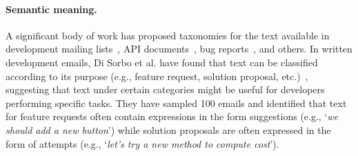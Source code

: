 









\paragraph{\textbf{Semantic meaning.}}


A significant body of work has 
 proposed taxonomies for the text available 
 in development mailing lists~\cite{Sorbo2015, huang2018automating},
API documents~\cite{Maalej2013}, bug reports~\cite{Arya2019}, and others.
In written development emails, Di Sorbo et al. have found that 
text can be classified according to its purpose (e.g., feature request, solution proposal, etc.)~\cite{Sorbo2015},
suggesting that text under certain categories might be useful for developers performing specific tasks. 
They have sampled 100 emails and identified that text for feature requests 
often contain expressions in the form suggestions
(e.g., `\textit{we should add a new button}') while solution proposals 
are often expressed in the form of attempts (e.g., `\textit{let's try a new method to compute cost}').



